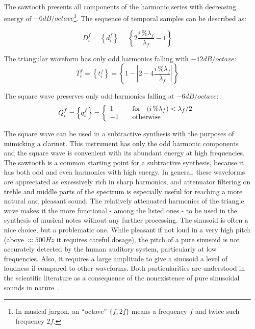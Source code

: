 The sawtooth presents all components of the harmonic series with decreasing energy of $-6dB/octave$\footnote{In 
musical jargon, an ``octave'' $\{f,2f\}$ means a frequency $f$ and twice such frequency $2f$.}. The sequence of temporal samples can be described as:

\begin{equation}\label{sawTooth}
     D^f_i=\left\{ d^f_i \right\}=\left\{ 2\frac{i\,\%\lambda_f}{\lambda_f} -1 \right\}
\end{equation}

The triangular waveform has only odd harmonics falling with $-12dB/octave$:
\begin{equation}\label{triangular}
     T^f_i=\left\{ t^f_i \right\}=\left\{1- \left| 2 - 4\frac{i\,\%\lambda_f}{\lambda_f} \right| \right\}
\end{equation}

The square wave preserves only odd harmonics falling at $-6dB/octave$:
\begin{equation}\label{square}
     Q^f_i=\left\{ q^f_i \right\}= \left\{
         \begin{array}{l l}
              1 & \quad \text{for } \; \; (i\,\%\lambda_f)   <  \lambda_f /2  \\
              -1 & \quad \text{otherwise}\\
         \end{array} \right.
\end{equation}

The square wave can be used in a subtractive synthesis with the purposes of mimicking a clarinet. This instrument has only the odd harmonic components and the square wave is convenient with its abundant energy at high frequencies.
The sawtooth is a common starting point for a subtractive synthesis, because it has both odd and even harmonics with high energy. In general, these waveforms are appreciated as excessively rich in sharp harmonics, and attenuator filtering on treble and middle parts of the spectrum is especially useful for reaching a more natural and pleasant sound. 
The relatively attenuated harmonics of the triangle wave makes it the more functional - among the listed ones - to be used in the synthesis of musical notes without any further processing. The sinusoid is often a nice choice, but a problematic one. While pleasant if not loud in a very high pitch (above $\approx 500Hz$ it requires careful dosage), the pitch of a pure sinusoid is not accurately detected by the human auditory system, particularly at low frequencies. Also, it requires a large amplitude to give a sinusoid a level of loudness if compared to other waveforms. Both particularities are understood in the scientific literature as a consequence of the nonexistence of pure sinusoidal sounds in nature~\cite{Roederer}.

